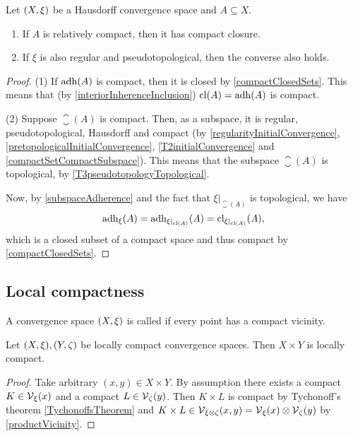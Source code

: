 \begin{proposition}
Let $\sSet{X,\xi}$ be a Hausdorff convergence space and $A\subseteq X$.
\begin{enumerate}
\item If $A$ is relatively compact, then it has compact closure.
\item If $\xi$ is also regular and pseudotopological, then the converse also holds.
\end{enumerate}
\end{proposition}
\begin{proof}
(1) If $\operatorname{adh}(A)$ is compact, then it is closed by \ref{compactClosedSets}. This means that (by \ref{interiorInherenceInclusion}) $\operatorname{cl}(A) = \operatorname{adh}(A)$ is compact.

(2) Suppose $\closure(A)$ is compact. Then, as a subspace, it is regular, pseudotopological, Hausdorff and compact (by \ref{regularityInitialConvergence}, \ref{pretopologicalInitialConvergence}, \ref{T2initialConvergence} and \ref{compactSetCompactSubspace}). This means that the subspace $\closure(A)$ is topological, by \ref{T3pseudotopologyTopological}.

Now, by \ref{subspaceAdherence} and the fact that $\xi|_{\closure(A)}$ is topological, we have
\[ \operatorname{adh}_\xi(A) = \operatorname{adh}_{\xi|_{\operatorname{cl}(A)}}(A) = \operatorname{cl}_{\xi|_{\operatorname{cl}(A)}}(A), \]
which is a closed subset of a compact space and thus compact by \ref{compactClosedSets}.
\end{proof}

\subsection{Local compactness}
\begin{definition}
A convergence space $\sSet{X, \xi}$ is called  if every point has a compact vicinity.
\end{definition}

\begin{lemma} \label{productLocallyCompact}
Let $\sSet{X,\xi}, \sSet{Y,\zeta}$ be locally compact convergence spaces. Then $X\times Y$ is locally compact.
\end{lemma}
\begin{proof}
Take arbitrary $(x,y)\in X\times Y$. By assumption there exists a compact $K\in \operatorname{\mathcal{V}}_{\xi}(x)$ and a compact $L\in \operatorname{\mathcal{V}}_\zeta(y)$. Then $K\times L$ is compact by Tychonoff's theorem \ref{TychonoffsTheorem} and $K\times L\in \operatorname{\mathcal{V}}_{\xi\otimes \zeta}(x,y) = \operatorname{\mathcal{V}}_\xi(x)\otimes \operatorname{\mathcal{V}}_\zeta(y)$ by \ref{productVicinity}. 
\end{proof}

